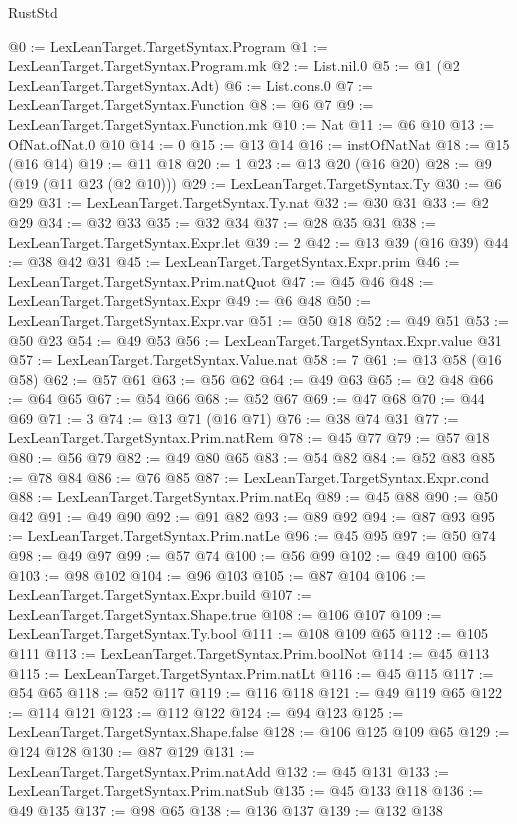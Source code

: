 \begin{lexlean}{RustStd}
\begin{coremodule}
@0 := LexLeanTarget.TargetSyntax.Program
@1 := LexLeanTarget.TargetSyntax.Program.mk
@2 := List.nil.{0}
@5 := @1 (@2 LexLeanTarget.TargetSyntax.Adt)
@6 := List.cons.{0}
@7 := LexLeanTarget.TargetSyntax.Function
@8 := @6 @7
@9 := LexLeanTarget.TargetSyntax.Function.mk
@10 := Nat
@11 := @6 @10
@13 := OfNat.ofNat.{0} @10
@14 := 0
@15 := @13 @14
@16 := instOfNatNat
@18 := @15 (@16 @14)
@19 := @11 @18
@20 := 1
@23 := @13 @20 (@16 @20)
@28 := @9 (@19 (@11 @23 (@2 @10)))
@29 := LexLeanTarget.TargetSyntax.Ty
@30 := @6 @29
@31 := LexLeanTarget.TargetSyntax.Ty.nat
@32 := @30 @31
@33 := @2 @29
@34 := @32 @33
@35 := @32 @34
@37 := @28 @35 @31
@38 := LexLeanTarget.TargetSyntax.Expr.let
@39 := 2
@42 := @13 @39 (@16 @39)
@44 := @38 @42 @31
@45 := LexLeanTarget.TargetSyntax.Expr.prim
@46 := LexLeanTarget.TargetSyntax.Prim.natQuot
@47 := @45 @46
@48 := LexLeanTarget.TargetSyntax.Expr
@49 := @6 @48
@50 := LexLeanTarget.TargetSyntax.Expr.var
@51 := @50 @18
@52 := @49 @51
@53 := @50 @23
@54 := @49 @53
@56 := LexLeanTarget.TargetSyntax.Expr.value @31
@57 := LexLeanTarget.TargetSyntax.Value.nat
@58 := 7
@61 := @13 @58 (@16 @58)
@62 := @57 @61
@63 := @56 @62
@64 := @49 @63
@65 := @2 @48
@66 := @64 @65
@67 := @54 @66
@68 := @52 @67
@69 := @47 @68
@70 := @44 @69
@71 := 3
@74 := @13 @71 (@16 @71)
@76 := @38 @74 @31
@77 := LexLeanTarget.TargetSyntax.Prim.natRem
@78 := @45 @77
@79 := @57 @18
@80 := @56 @79
@82 := @49 @80 @65
@83 := @54 @82
@84 := @52 @83
@85 := @78 @84
@86 := @76 @85
@87 := LexLeanTarget.TargetSyntax.Expr.cond
@88 := LexLeanTarget.TargetSyntax.Prim.natEq
@89 := @45 @88
@90 := @50 @42
@91 := @49 @90
@92 := @91 @82
@93 := @89 @92
@94 := @87 @93
@95 := LexLeanTarget.TargetSyntax.Prim.natLe
@96 := @45 @95
@97 := @50 @74
@98 := @49 @97
@99 := @57 @74
@100 := @56 @99
@102 := @49 @100 @65
@103 := @98 @102
@104 := @96 @103
@105 := @87 @104
@106 := LexLeanTarget.TargetSyntax.Expr.build
@107 := LexLeanTarget.TargetSyntax.Shape.true
@108 := @106 @107
@109 := LexLeanTarget.TargetSyntax.Ty.bool
@111 := @108 @109 @65
@112 := @105 @111
@113 := LexLeanTarget.TargetSyntax.Prim.boolNot
@114 := @45 @113
@115 := LexLeanTarget.TargetSyntax.Prim.natLt
@116 := @45 @115
@117 := @54 @65
@118 := @52 @117
@119 := @116 @118
@121 := @49 @119 @65
@122 := @114 @121
@123 := @112 @122
@124 := @94 @123
@125 := LexLeanTarget.TargetSyntax.Shape.false
@128 := @106 @125 @109 @65
@129 := @124 @128
@130 := @87 @129
@131 := LexLeanTarget.TargetSyntax.Prim.natAdd
@132 := @45 @131
@133 := LexLeanTarget.TargetSyntax.Prim.natSub
@135 := @45 @133 @118
@136 := @49 @135
@137 := @98 @65
@138 := @136 @137
@139 := @132 @138

\end{coremodule}
\end{lexlean}
